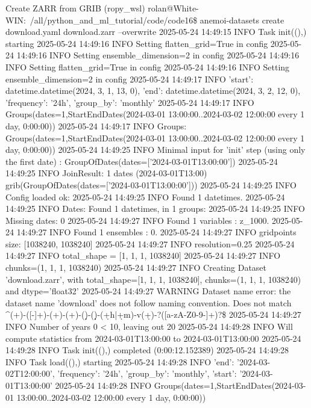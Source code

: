 \begin{codeonly}{Create ZARR from GRIB}
(ropy_wsl) rolan@White-WIN:~/all/python_and_ml_tutorial/code/code16\$ anemoi-datasets create download.yaml download.zarr --overwrite
2025-05-24 14:49:15 INFO Task init((),{}) starting
2025-05-24 14:49:16 INFO Setting flatten_grid=True in config
2025-05-24 14:49:16 INFO Setting ensemble_dimension=2 in config
2025-05-24 14:49:16 INFO Setting flatten_grid=True in config
2025-05-24 14:49:16 INFO Setting ensemble_dimension=2 in config
2025-05-24 14:49:17 INFO {'start': datetime.datetime(2024, 3, 1, 13, 0), 'end': datetime.datetime(2024, 3, 2, 12, 0), 'frequency': '24h', 'group_by': 'monthly'}
2025-05-24 14:49:17 INFO Groups(dates=1,StartEndDates(2024-03-01 13:00:00..2024-03-02 12:00:00 every 1 day, 0:00:00))
2025-05-24 14:49:17 INFO Groups: Groups(dates=1,StartEndDates(2024-03-01 13:00:00..2024-03-02 12:00:00 every 1 day, 0:00:00))
2025-05-24 14:49:25 INFO Minimal input for 'init' step (using only the first date) : GroupOfDates(dates=['2024-03-01T13:00:00'])
2025-05-24 14:49:25 INFO JoinResult: 1 dates (2024-03-01T13:00)
  grib(GroupOfDates(dates=['2024-03-01T13:00:00']))
2025-05-24 14:49:25 INFO Config loaded ok:
2025-05-24 14:49:25 INFO Found 1 datetimes.
2025-05-24 14:49:25 INFO Dates: Found 1 datetimes, in 1 groups:
2025-05-24 14:49:25 INFO Missing dates: 0
2025-05-24 14:49:27 INFO Found 1 variables : z_1000.
2025-05-24 14:49:27 INFO Found 1 ensembles : 0.
2025-05-24 14:49:27 INFO gridpoints size: [1038240, 1038240]
2025-05-24 14:49:27 INFO resolution=0.25
2025-05-24 14:49:27 INFO total_shape = [1, 1, 1, 1038240]
2025-05-24 14:49:27 INFO chunks=(1, 1, 1, 1038240)
2025-05-24 14:49:27 INFO Creating Dataset 'download.zarr', with total_shape=[1, 1, 1, 1038240], chunks=(1, 1, 1, 1038240) and dtype='float32'
2025-05-24 14:49:27 WARNING Dataset name error: the dataset name 'download' does not follow naming convention. Does not match ^(\w+)-([\w-]+)-(\w+)-(\w+)-(\d\d\d\d)-(\d\d\d\d)-(\d+h|\d+m)-v(\d+)-?([a-zA-Z0-9-]+)?\$
2025-05-24 14:49:27 INFO Number of years 0 < 10, leaving out 20%
2025-05-24 14:49:28 INFO Will compute statistics from 2024-03-01T13:00:00 to 2024-03-01T13:00:00
2025-05-24 14:49:28 INFO Task init((),{}) completed (0:00:12.152389)
2025-05-24 14:49:28 INFO Task load((),{}) starting
2025-05-24 14:49:28 INFO {'end': '2024-03-02T12:00:00', 'frequency': '24h', 'group_by': 'monthly', 'start': '2024-03-01T13:00:00'}
2025-05-24 14:49:28 INFO Groups(dates=1,StartEndDates(2024-03-01 13:00:00..2024-03-02 12:00:00 every 1 day, 0:00:00))

\end{codeonly}
